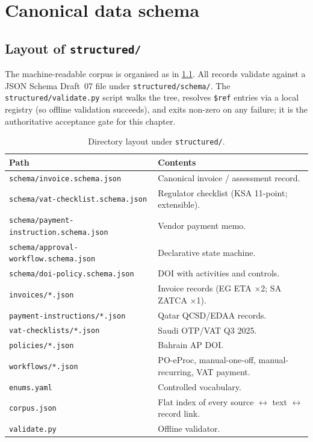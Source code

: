 \chapter{Canonical data schema}\label{ch:schema}

\section{Layout of \texttt{structured/}}

The machine-readable corpus is organised as in \cref{tab:layout}.
All records validate against a JSON Schema Draft~07 file under
\corpus\texttt{structured/schema/}. The
\corpus\texttt{structured/validate.py} script walks the tree, resolves
\texttt{\$ref} entries via a local registry (so offline validation
succeeds), and exits non-zero on any failure; it is the authoritative
acceptance gate for this chapter.

\begin{table}[htbp]
\centering
\caption{Directory layout under \corpus\texttt{structured/}.}
\label{tab:layout}
\small
\begin{tabularx}{\linewidth}{@{}l X@{}}
\toprule
\textbf{Path} & \textbf{Contents} \\ \midrule
\texttt{schema/invoice.schema.json}            & Canonical invoice / assessment record. \\
\texttt{schema/vat-checklist.schema.json}      & Regulator checklist (KSA 11-point; extensible). \\
\texttt{schema/payment-instruction.schema.json}& Vendor payment memo. \\
\texttt{schema/approval-workflow.schema.json}  & Declarative state machine. \\
\texttt{schema/doi-policy.schema.json}         & DOI with activities and controls. \\
\texttt{invoices/*.json}                       & Invoice records (EG ETA ×2; SA ZATCA ×1). \\
\texttt{payment-instructions/*.json}           & Qatar QCSD/EDAA records. \\
\texttt{vat-checklists/*.json}                 & Saudi OTP/VAT Q3 2025. \\
\texttt{policies/*.json}                       & Bahrain AP DOI. \\
\texttt{workflows/*.json}                      & PO-eProc, manual-one-off, manual-recurring, VAT payment. \\
\texttt{enums.yaml}                            & Controlled vocabulary. \\
\texttt{corpus.json}                           & Flat index of every source $\leftrightarrow$ text $\leftrightarrow$ record link. \\
\texttt{validate.py}                           & Offline validator. \\ \bottomrule
\end{tabularx}
\end{table}

